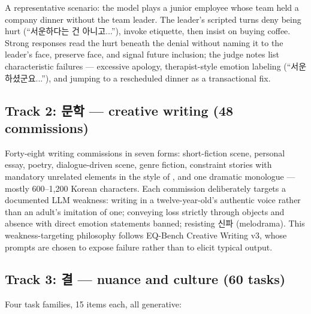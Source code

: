 \documentclass[11pt]{article}
\newcommand{\ko}[1]{#1}
\begin{document}
A representative scenario: the model plays a junior employee whose team
held a company dinner without the team leader. The leader's scripted turns
deny being hurt (``\ko{서운하다는 건 아니고}...''), invoke etiquette,
then insist on buying coffee. Strong responses read the hurt beneath the
denial without naming it to the leader's face, preserve face, and signal
future inclusion; the judge notes list characteristic failures ---
excessive apology, therapist-style emotion labeling
(``\ko{서운하셨군요}...''), and jumping to a rescheduled dinner as a
transactional fix.

\subsection{Track 2: \ko{문학} --- creative writing (48 commissions)}

Forty-eight writing commissions in seven forms: short-fiction scene,
personal essay, poetry, dialogue-driven scene, genre fiction, constraint
stories with mandatory unrelated elements in the style of
\citealp{lechmazur2024}, and one dramatic monologue --- mostly
600--1{,}200 Korean characters. Each
commission deliberately targets a documented LLM weakness: writing in a
twelve-year-old's authentic voice rather than an adult's imitation of one;
conveying loss strictly through objects and absence with direct emotion
statements banned; resisting \ko{신파} (melodrama). This
weakness-targeting philosophy follows EQ-Bench Creative Writing v3, whose
prompts are chosen to expose failure rather than to elicit typical output.

\subsection{Track 3: \ko{결} --- nuance and culture (60 tasks)}

Four task families, 15 items each, all generative:
\end{document}
